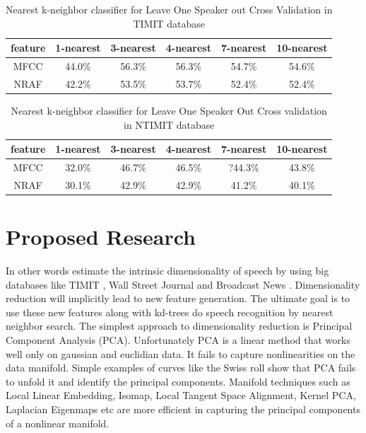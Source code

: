 \documentclass[12pt,letterpaper,doublespaced,ETD,dvips,proposal]{gtthesis}
\begin{document}
\begin{Body}
\begin{table}[!htb]
\footnotesize{ \centering
\begin{tabular}{|c|c|c|c|c|c|}
  \hline
  feature & 1-nearest & 3-nearest & 4-nearest & 7-nearest & 10-nearest \\
  \hline
  MFCC & 44.0\% & 56.3\% & 56.3\% & 54.7\% & 54.6\% \\
  NRAF & 42.2\% & 53.5\% & 53.7\% & 52.4\% & 52.4\% \\
  \hline
\end{tabular}
\caption{Nearest k-neighbor classifier for
  Leave One Speaker out Cross Validation in TIMIT database}
} \label{kneighborLOOCVTIMIT}
\end{table}

\begin{table}[!htb]
\footnotesize{ \centering
\begin{tabular}{|c|c|c|c|c|c|}
  \hline
  feature & 1-nearest & 3-nearest & 4-nearest & 7-nearest & 10-nearest \\
  \hline
  MFCC & 32.0\% & 46.7\% & 46.5\% & ?44.3\% & 43.8\% \\
  NRAF & 30.1\% & 42.9\% & 42.9\% & 41.2\% & 40.1\% \\
  \hline
\end{tabular}
  \caption{Nearest k-neighbor classifier for Leave One Speaker Out
  Cross validation in  NTIMIT database}
} \label{kneighborLOOCVNTIMIT}
\end{table}

\pagebreak
\newpage
\section{Proposed Research}
\label{proposed}
In other words estimate the intrinsic dimensionality of speech by
using big databases like TIMIT \cite{garofolo1993tap}, Wall Street Journal and Broadcast
News \cite{graff1997bns}. Dimensionality reduction will implicitly lead to new feature
generation. The ultimate goal is to use these new features along
with kd-trees do speech recognition by nearest neighbor search. The simplest approach to dimensionality 
reduction is Principal Component Analysis (PCA). Unfortunately PCA is a linear method that works well 
only on gaussian and euclidian data. It fails to capture nonlinearities on the data manifold. Simple 
examples of curves like the Swiss roll show that PCA fails to unfold it 
and identify the principal components. Manifold techniques such as Local Linear Embedding, Isomap, 
Local Tangent Space Alignment, Kernel PCA, Laplacian Eigenmaps etc are more  efficient in capturing 
the principal components of a nonlinear manifold. 


\end{Body}
\end{document}
